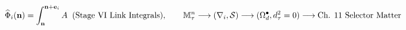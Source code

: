 \documentclass[preview]{standalone}
\begin{document}
\begin{align*}
\special{dvisvgm:raw <g id='unique000'>}\widehat{\Phi}_i(\mathbf{n}) = \int_{\mathbf{n}}^{\mathbf{n}+\mathbf{e}_i} A\;\;(\text{Stage VI Link Integrals}), \qquad \mathbb{M}_\tau^n \longrightarrow (\nabla_i, \mathcal{S}) \longrightarrow (\Omega_d^\bullet, d_\tau^2 = 0) \longrightarrow \text{Ch. 11 Selector Matter}\special{dvisvgm:raw </g>}
\end{align*}
\end{document}
